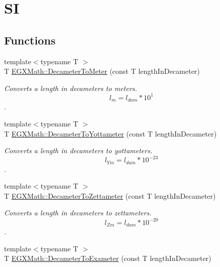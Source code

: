 \hypertarget{group___e_g_x_math-_conversions-_length_conversions-_decameter-_s_i}{}\section{SI}
\label{group___e_g_x_math-_conversions-_length_conversions-_decameter-_s_i}
\subsection*{Functions}
\begin{DoxyCompactItemize}
\item 
{\footnotesize template$<$typename T $>$ }\\T \mbox{\hyperlink{group___e_g_x_math-_conversions-_length_conversions-_decameter-_s_i_gac7f762a09c6496efaab29ecdbfb88a2c}{E\+G\+X\+Math\+::\+Decameter\+To\+Meter}} (const T length\+In\+Decameter)
\begin{DoxyCompactList}\small\item\em Converts a length in decameters to meters. \[ l_{m}=l_{dam} * 10^{1} \]. \end{DoxyCompactList}\item 
{\footnotesize template$<$typename T $>$ }\\T \mbox{\hyperlink{group___e_g_x_math-_conversions-_length_conversions-_decameter-_s_i_gaa10c7c9c4e75fc2d647d4f85ff8d801b}{E\+G\+X\+Math\+::\+Decameter\+To\+Yottameter}} (const T length\+In\+Decameter)
\begin{DoxyCompactList}\small\item\em Converts a length in decameters to yottameters. \[ l_{Ym}=l_{dam} * 10^{-23} \]. \end{DoxyCompactList}\item 
{\footnotesize template$<$typename T $>$ }\\T \mbox{\hyperlink{group___e_g_x_math-_conversions-_length_conversions-_decameter-_s_i_ga63a6a9ec3ac42c9837818b82b1fdbcbb}{E\+G\+X\+Math\+::\+Decameter\+To\+Zettameter}} (const T length\+In\+Decameter)
\begin{DoxyCompactList}\small\item\em Converts a length in decameters to zettameters. \[ l_{Zm}=l_{dam} * 10^{-20} \]. \end{DoxyCompactList}\item 
{\footnotesize template$<$typename T $>$ }\\T \mbox{\hyperlink{group___e_g_x_math-_conversions-_length_conversions-_decameter-_s_i_ga66b4bffe5923acdb3c8a249d81be196f}{E\+G\+X\+Math\+::\+Decameter\+To\+Exameter}} (const T length\+In\+Decameter)

\end{DoxyCompactItemize}
